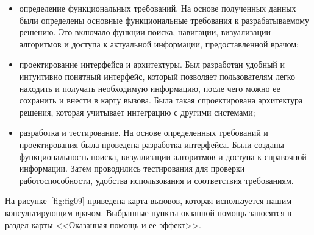 \begin{itemize}
 \item определение функциональных требований. На основе полученных данных были определены основные функциональные требования к разрабатываемому решению. Это включало функции поиска, навигации, визуализации алгоритмов и доступа к актуальной информации, предоставленной врачом;

 \item проектирование интерфейса и архитектуры. Был разработан удобный и интуитивно понятный интерфейс, который позволяет пользователям легко находить и получать необходимую информацию, после чего можно ее сохранить и внести в карту вызова. Была такая спроектирована архитектура решения, которая учитывает интеграцию с другими системами;

 \item разработка и тестирование. На основе определенных требований и проектирования была проведена разработка интерфейса. Были созданы функциональность поиска, визуализации алгоритмов и доступа к справочной информации. Затем проводились тестирования для проверки работоспособности, удобства использования и соответствия требованиям.

\end{itemize}

На рисунке~\ref{fig:fig09} приведена карта вызовов, которая используется нашим консультирующим врачом. Выбранные пункты окзанной помощь заносятся в раздел карты <<Оказанная помощь и ее эффект>>.

